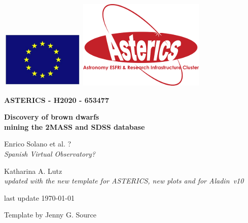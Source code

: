 \documentclass [a4paper, 12pt]{article}
\newcommand{\aladin}{{\textsc{A}{ladin}}}
\begin{document}
\begin{center}\includegraphics[width=0.3\textwidth]{../images/logo_euro.png} 
\hspace{5cm}\includegraphics[width=0.4 
\textwidth]{../images/logo_asterics.png}\\
\vspace{1.5cm}
\begin{Huge} \textbf{ASTERICS - H2020 - 653477} \end{Huge} \end{center}

 
 \vspace{1cm}
\Huge
\begin{center}
\bf Discovery of brown dwarfs \\ mining the 2MASS and SDSS database
  \end{center}

 
\vspace{1cm}
\large
\begin{center}
Enrico Solano et al. ?\\ %
\textit{Spanish Virtual Observatory?}
\end{center}
\vspace{0.5cm}
\begin{center}
Katharina A. Lutz\\
\textit{updated with the new template for ASTERICS, new plots and for \aladin\ 
v10}
\end{center}
\vspace{0.5cm}
\begin{center}
last update \today
\end{center}


\vspace{3.5cm}
Template by Jenny G. Source


\newpage
\normalsize
\vfill
\tableofcontents
\vfill
\end{document}
